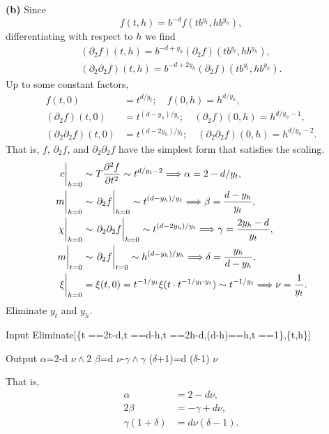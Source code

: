 \documentclass{article}
\makeatletter
\newcommand*{\shifttext}[1]{%
  \settowidth{\@tempdima}{#1}%
  \hspace{-\@tempdima}#1%
}
\newcommand{\plabel}[1]{%
\shifttext{\textbf{#1}\quad}%
}
\makeatother
\begin{document}
\plabel{(b)}%
Since
\[ f(t,h) = b^{-d} f(t b^{y_t}, h b^{y_h}), \]
differentiating with respect to $h$ we find
\begin{align*}
    (\partial_2 f)(t,h) = b^{-d + y_h} (\partial_2 f)(t b^{y_t}, h b^{y_h}), \\
    (\partial_2 \partial_2 f)(t,h) = b^{-d + 2y_h} (\partial_2 f)(t b^{y_t}, h b^{y_h}).
\end{align*}
Up to some constant factors,
\begin{align*}
    f(t,0) &= t^{d/y_t};\quad f(0,h) = h^{d/y_h}, \\
    (\partial_2 f)(t,0) &= t^{(d-y_h)/y_t};\quad (\partial_2 f)(0,h) = h^{d/y_h - 1}, \\
    (\partial_2\partial_2 f)(t,0) &= t^{(d-2y_h)/y_t};\quad (\partial_2\partial_2 f)(0,h) = h^{d/y_h - 2}.
\end{align*}
That is, $f$, $\partial_2 f$, and $\partial_2\partial_2 f$ have the simplest form that satisfies the scaling.
\begin{align*}
    \eval{c}_{h=0} &\sim T \pdv[2]{f}{t} \sim t^{d/y_t - 2} \Longrightarrow \alpha = 2-d/y_t, \\
    \eval{m}_{h=0} &\sim \eval{\partial_2 f}_{h=0} \sim t^{(d-y_h)/y_t} \Longrightarrow \beta = \frac{d-y_h}{y_t}, \\
    \eval{\chi}_{h=0} &\sim \eval{\partial_2 \partial_2 f}_{h=0} \sim t^{(d-2y_h)/y_t} \Longrightarrow \gamma = \frac{2y_h - d}{y_t}, \\
    \eval{m}_{t=0} &\sim \eval{\partial_2 f}_{t=0} \sim h^{(d-y_h)/y_h} \Longrightarrow \delta = \frac{y_h}{d-y_h}, \\
    \eval{\xi}_{h=0} &= \xi(t,0) = t^{-1/y_t} \xi(t\cdot t^{-1/y_t\cdot y_t}) \sim t^{-1/y_t} \Longrightarrow \nu = \frac{1}{y_t}.
\end{align*}
Eliminate $y_t$ and $y_h$.
\begin{mmaCell}[morefunctionlocal={t,h}]{Input}
Eliminate[\{t \mmaUnd{\(\pmb{\alpha}\)}==2t-d,t \mmaUnd{\(\pmb{\beta}\)}==d-h,t \mmaUnd{\(\pmb{\gamma}\)}==2h-d,(d-h)\mmaUnd{\(\pmb{\delta}\)}==h,t
\mmaUnd{\(\pmb{\nu}\)}==1\},\{t,h\}]
\end{mmaCell}
\begin{mmaCell}{Output}
\(\alpha\)=2-d \(\nu\land\)2 \(\beta\)=d \(\nu\)-\(\gamma\land\gamma\) (\(\delta\)+1)=d (\(\delta\)-1) \(\nu\)
\end{mmaCell}
That is,
\begin{align*}
    \alpha &= 2-d\nu, \\
    2\beta &= -\gamma + d\nu, \\
    \gamma(1+\delta) &= d\nu(\delta - 1).
\end{align*}
\end{document}
